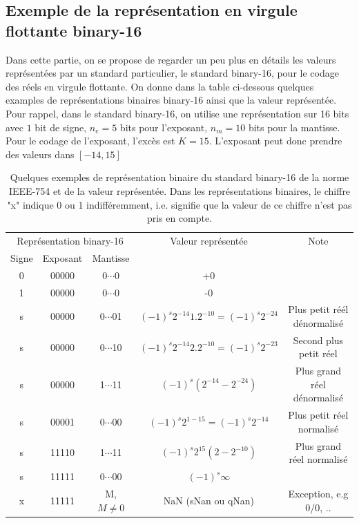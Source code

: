 \subsection{Exemple de la représentation en virgule flottante binary-16}

Dans cette partie, on se propose de regarder un peu plus en détails les valeurs représentées par un standard particulier, le standard binary-16, pour le codage des réels en virgule flottante. On donne dans la table ci-dessous quelques examples de représentations binaires binary-16 ainsi que la valeur représentée. Pour rappel, dans le standard binary-16, on utilise une représentation sur 16 bits avec $1$ bit de signe, $n_e=5$ bits pour l'exposant, $n_m=10$ bits pour la mantisse. Pour le codage de l'exposant, l'excès est $K = 15$. L'exposant peut donc prendre des valeurs dans $[-14, 15]$

\begin{center}\begin{table}[htbp]
\begin{tabular}{ccc|c|c}
\multicolumn{3}{c}{Représentation binary-16} & Valeur représentée & Note\\
Signe & Exposant & Mantisse & & \\
\hline\hline
0&00000&0$\cdots$0 & +0 & \\
1&00000&0$\cdots$0 & -0 & \\
s&00000&0$\cdots$01 & $(-1)^s 2^{-14} 1.2^{-10} = (-1)^s 2^{-24}$ & Plus petit réél dénormalisé\\
s&00000&0$\cdots$10 & $(-1)^s 2^{-14} 2.2^{-10} = (-1)^s 2^{-23}$ & Second plus petit réel\\
s&00000&1$\cdots$11 & $(-1)^s (2^{-14} - 2^{-24})$ & Plus grand réel dénormalisé\\
s&00001&0$\cdots$00 & $(-1)^s 2^{1-15} = (-1)^s 2^{-14}$ & Plus petit réel normalisé \\
s&11110&1$\cdots$11 & $(-1)^s 2^{15} (2 - 2^{-10})$& Plus grand réel normalisé \\
s&11111&0$\cdots$00 & $(-1)^s \infty$ & \\
x&11111& M, $M \neq 0$ & NaN (sNan ou qNan) & Exception, e.g 0/0, ..
\end{tabular}
\caption{Quelques exemples de représentation binaire du standard binary-16 de la norme IEEE-754 et de la valeur représentée. Dans les représentations binaires, le chiffre "x" indique 0 ou 1 indifféremment, i.e. signifie que la valeur de ce chiffre n'est pas pris en compte.}
\end{table}
\end{center}

